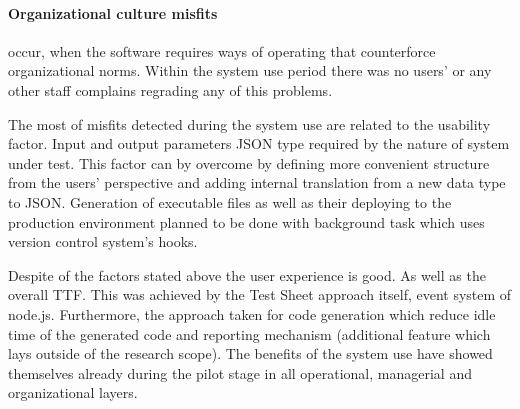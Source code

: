\paragraph{Organizational culture misfits}  occur, when the software requires ways of operating that counterforce organizational norms. Within the system use period there was no users' or any other staff complains regrading any of this problems.


The most of misfits detected during the system use are related to the usability factor.
Input and output parameters JSON type required by the nature of system under test. This factor can by overcome by defining more convenient structure from the users' perspective and  adding internal translation from a new data type to JSON.
Generation of executable files as well as their deploying to the production environment planned to be done with background task which uses version control system's hooks.


Despite of the factors stated above the user experience is good. As well as the overall TTF. This was achieved by the Test Sheet approach itself, event system of node.js. Furthermore, the approach taken for code generation which reduce idle time of the generated code and reporting mechanism (additional feature which lays outside of the research scope).
The benefits of the system use have showed themselves already during the pilot stage in all operational, managerial and organizational layers.
